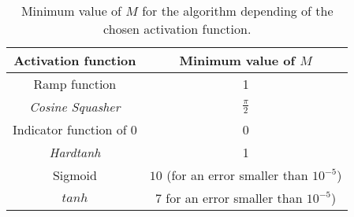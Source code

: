 \begin{table}[h]
    \centering
    \begin{tabular}{|c|c|}
    \hline
        Activation function  & Minimum value of $M$ \\ \hline
        Ramp function & 1 \\ \hline
        \textit{Cosine Squasher} & $\frac{\pi}{2}$ \\ \hline
        Indicator function of 0 & 0 \\ \hline
        \textit{Hardtanh} & 1 \\ \hline
        Sigmoid  &  $10$ (for an error smaller than $10^{-5}$)\\ \hline
        $tanh$ &  $7$ for an error smaller than $10^{-5}$)\\ \hline
    \end{tabular}
    \caption{
        Minimum value of $M$ for the algorithm depending of the chosen activation function.
    }
    \label{table:M-activation-function}
\end{table}





